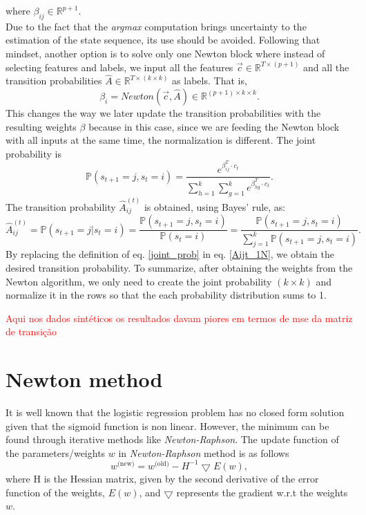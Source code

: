 \documentclass{article}
\begin{document}
where $\beta_{ij} \in \mathbb{R}^{p+1}$. \\ \noindent
Due to the fact that the \textit{argmax} computation brings uncertainty to the estimation of the state sequence, its use should be avoided. Following that mindset, another option is to solve only one Newton block where instead of selecting features and labels, we input all the features $\Vec{c} \in \mathbb{R}^{T \times (p+1)}$ and all the transition probabilities $\hat{A} \in \mathbb{R}^{T \times (k \times k)}$ as labels. That is,
\begin{equation}
    \beta_i = Newton(\Vec{c}, \hat{A}) \in \mathbb{R}^{(p+1)\times k \times k}.
    \label{newton_block2}
\end{equation}
This changes the way we later update the transition probabilities with the resulting weights $\beta$ because in this case, since we are feeding the Newton block with all inputs at the same time, the normalization is different. The joint probability is
\begin{equation}
    \mathbb{P}(s_{t+1}=j,s_{t}=i) = \dfrac{e^{\beta_{ij}^T \cdot c_t}}{\sum_{h=1}^k \sum_{g=1}^k  e^{\beta_{hg}^T\cdot c_t}}.
    \label{joint_prob}
\end{equation}
The transition probability $\hat{A}_{ij}^{(t)}$ is obtained, using Bayes' rule, as:
\begin{equation}
    \hat{A}_{ij}^{(t)} = \mathbb{P}(s_{t+1}=j|s_{t}=i) = \dfrac{ \mathbb{P}(s_{t+1}=j,s_{t}=i)}{ \mathbb{P}(s_{t}=i)} = \dfrac{ \mathbb{P}(s_{t+1}=j,s_{t}=i)}{\sum_{j=1}^k \mathbb{P}(s_{t+1}=j,s_{t}=i)}.
    \label{Aijt_1N}
\end{equation}
By replacing the definition of eq. \eqref{joint_prob} in eq. \eqref{Aijt_1N}, we obtain the desired transition probability. To summarize, after obtaining the weights from the Newton algorithm, we only need to create the joint probability $(k\times k)$ and normalize it in the rows so that the each probability distribution sums to 1.


\textcolor{red}{Aqui nos dados sintéticos os resultados davam piores em termos de mse da matriz de transição}

\section{Newton method}
It is well known that the logistic regression problem has no closed form solution given that the sigmoid function is non linear. However, the minimum can be found through iterative methods like \textit{Newton-Raphson}. The update function of the parameters/weights $w$ in \textit{Newton-Raphson} method is as follows
\begin{equation}
    w^{\text{(new)}} = w^{\text{(old)}}-H^{-1}\bigtriangledown E(w),
\end{equation}
where H is the Hessian matrix, given by the second derivative of the error function of the weights, $E(w)$, and $\bigtriangledown$ represents the gradient w.r.t the weights $w$.
\end{document}
